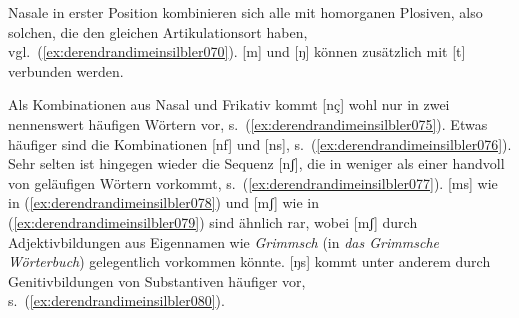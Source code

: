 \Stretch[0.25]

\begin{exe}
\end{exe}

\Stretch[0.25]

Nasale in erster Position kombinieren sich alle mit homorganen Plosiven, also solchen, die den gleichen Artikulationsort haben, vgl.\ (\ref{ex:derendrandimeinsilbler070}).
[m] und [ŋ] können zusätzlich mit [t] verbunden werden.

\Np

\begin{exe}
  \ex\label{ex:derendrandimeinsilbler070}
  \begin{xlist}
  \end{xlist}
\end{exe}

Als Kombinationen aus Nasal und Frikativ kommt [nç] wohl nur in zwei nennenswert häufigen Wörtern vor, s.\ (\ref{ex:derendrandimeinsilbler075}).
Etwas häufiger sind die Kombinationen [nf] und [ns], s.\ (\ref{ex:derendrandimeinsilbler076}).
Sehr selten ist hingegen wieder die Sequenz [nʃ], die in weniger als einer handvoll von geläufigen Wörtern vorkommt, s.\ (\ref{ex:derendrandimeinsilbler077}).
[ms] wie in (\ref{ex:derendrandimeinsilbler078}) und [mʃ] wie in (\ref{ex:derendrandimeinsilbler079}) sind ähnlich rar, wobei [mʃ] durch Adjektivbildungen aus Eigennamen wie \textit{Grimmsch} (in \textit{das Grimmsche Wörterbuch}) gelegentlich vorkommen könnte.
[ŋs] kommt unter anderem durch Genitivbildungen von Substantiven häufiger vor, s.\ (\ref{ex:derendrandimeinsilbler080}).

\begin{exe}
  \ex\label{ex:derendrandimeinsilbler074}
  \begin{xlist}
  \end{xlist}
\end{exe}

